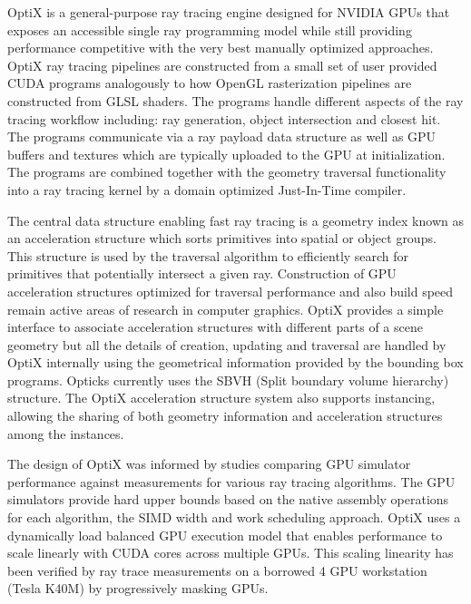 \documentclass[a4paper]{jpconf}
\begin{document}
OptiX\cite{optixPaper} \cite{optixSite} is a general-purpose ray tracing engine 
designed for NVIDIA GPUs that exposes an accessible single ray programming model 
while still providing performance competitive with the very best   
manually optimized approaches\cite{understanding}\cite{understandingAddendum}.  
%
OptiX ray tracing pipelines are constructed from a small set of user 
provided CUDA programs analogously to how OpenGL rasterization pipelines are 
constructed from GLSL shaders. The programs handle different aspects of the ray 
tracing workflow including: ray generation, object intersection and closest hit.
The programs communicate via a ray payload data structure as well as GPU buffers and 
textures which are typically uploaded to the GPU at initialization.
The programs are combined together with the geometry traversal functionality 
into a ray tracing kernel by a domain optimized Just-In-Time compiler.

The central data structure enabling fast ray tracing is a geometry index
known as an acceleration structure which sorts primitives 
into spatial or object groups. This structure is used by the traversal 
algorithm to efficiently search for primitives that potentially intersect a
given ray. Construction of GPU acceleration structures optimized for traversal
performance and also build speed remain active areas of research in computer graphics.
OptiX provides a simple interface to associate acceleration structures 
with different parts of a scene geometry but all the details of creation, updating 
and traversal are handled by OptiX internally using the geometrical information provided by the 
bounding box programs. Opticks currently uses the SBVH (Split boundary volume hierarchy) structure\cite{sbvh}.
The OptiX acceleration structure system also supports instancing, allowing 
the sharing of both geometry information and acceleration structures among the
instances.

The design of OptiX was informed by studies\cite{understanding}\cite{understandingAddendum}
comparing GPU simulator performance against measurements
for various ray tracing algorithms. The GPU simulators 
provide hard upper bounds based on the native assembly operations
for each algorithm, the SIMD width and work scheduling approach. 
OptiX uses a dynamically load balanced GPU execution model that enables
performance to scale linearly with CUDA cores across multiple GPUs. 
This scaling linearity has been verified by ray trace measurements on a 
borrowed 4 GPU workstation (Tesla K40M) by progressively masking GPUs.
\end{document}
